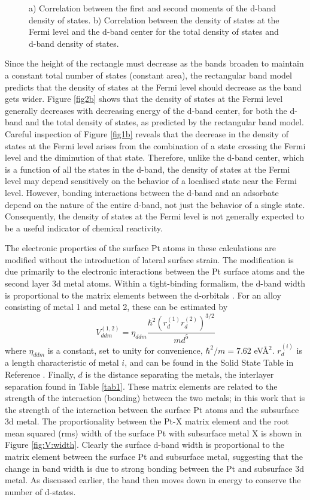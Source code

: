 \documentclass[aps,preprint,superscriptaddress,endfloats*]{revtex4}
\begin{document}
\begin{figure}
\caption{\label{fig2}
  a) Correlation between the first and second moments of the d-band
  density of states. b) Correlation between the density of states at
  the Fermi level and the d-band center for the total density of
  states and d-band density of states.}
\end{figure}

Since the height of the rectangle must decrease as the bands broaden
to maintain a constant total number of states (constant area), the
rectangular band model predicts that the density of states at the
Fermi level should decrease as the band gets wider.  Figure
\ref{fig2b} shows that the density of states at the Fermi level
generally decreases with decreasing energy of the d-band center, for
both the d-band and the total density of states, as predicted by the
rectangular band model.  Careful inspection of Figure \ref{fig1b}
reveals that the decrease in the density of states at the Fermi level
arises from the combination of a state crossing the Fermi level and
the diminution of that state.  Therefore, unlike the d-band center,
which is a function of all the states in the d-band, the density of
states at the Fermi level may depend sensitively on the behavior of a
localised state near the Fermi level. However, bonding interactions
between the d-band and an adsorbate depend on the nature of the entire
d-band, not just the behavior of a single state.  Consequently, the
density of states at the Fermi level is not generally expected to be a
useful indicator of chemical reactivity.

The electronic properties of the surface Pt atoms in these
calculations are modified without the introduction of lateral surface
strain.  The modification is due primarily to the electronic
interactions between the Pt surface atoms and the second layer 3d
metal atoms.  Within a tight-binding formalism, the d-band width is
proportional to the matrix elements between the d-orbitals
\cite{harrison1989}. For an alloy consisting of metal 1 and metal 2,
these can be estimated by
\begin{equation}
V_{ddm}^{(1,2)}=\eta_{ddm} \frac{\hbar^2(r_d^{(1)}r_d^{(2)})^{3/2}}{md^5}
\end{equation}
where $\eta_{ddm}$ is a constant, set to unity for convenience,
$\hbar^2/m=7.62$ eV\AA$^2$.  $r_d^{(i)}$ is a length characteristic of
metal $i$, and can be found in the Solid State Table in Reference
\citealp{harrison1989}. Finally, $d$ is the distance separating the
metals, the interlayer separation found in Table \ref{tab1}.  These
matrix elements are related to the strength of the interaction
(bonding) between the two metals; in this work that is the strength of
the interaction between the surface Pt atoms and the subsurface 3d
metal.  The proportionality between the Pt-X matrix element and the
root mean squared (rms) width of the surface Pt with subsurface metal
X is shown in Figure \ref{fig:V:width}. Clearly the surface d-band
width is proportional to the matrix element between the surface Pt and
subsurface metal, suggesting that the change in band width is due to
strong bonding between the Pt and subsurface 3d metal. As discussed
earlier, the band then moves down in energy to conserve the number of
d-states.
\end{document}
